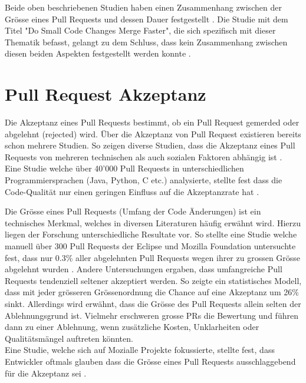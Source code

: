 Beide oben beschriebenen Studien haben einen Zusammenhang zwischen der Grösse eines Pull Requests und dessen Dauer festgestellt \parencite{yu_wait_2015}\parencite{hasan_understanding_2023}. Die Studie mit dem Titel "Do Small Code Changes Merge Faster", die sich spezifisch mit dieser Thematik befasst, gelangt zu dem Schluss, dass kein Zusammenhang zwischen diesen beiden Aspekten festgestellt werden konnte \parencite{kudrjavets_small_2022}.





\section{Pull Request Akzeptanz}
Die Akzeptanz eines Pull Requests bestimmt, ob ein Pull Request gemerded oder abgelehnt (rejected) wird. Über die Akzeptanz von Pull Request existieren bereits schon mehrere Studien. 
So zeigen diverse Studien, dass die Akzeptanz eines Pull Requests von mehreren technischen als auch sozialen Faktoren abhängig ist \parencite{gousios_exploratory_2014}. \\
Eine Studie welche über 40'000 Pull Requests in unterschiedlichen Programmiersprachen (Java, Python, C etc.) analysierte, stellte fest dass die Code-Qualität nur einen geringen Einfluss auf die Akzeptanzrate hat \parencite{kuhejda_pull_2023}.

Die Grösse eines Pull Requests (Umfang der Code Änderungen) ist ein technisches Merkmal, welches in diversen Literaturen häufig erwähnt wird. Hierzu liegen der Forschung unterschiedliche Resultate vor. So stellte eine Studie welche manuell über 300 Pull Requests der Eclipse und Mozilla Foundation untersuchte fest, dass nur 0.3\% aller abgelehnten Pull Requests wegen ihrer zu grossen Grösse abgelehnt wurden \parencite{tao_writing_2014}. Andere Untersuchungen ergaben, dass umfangreiche Pull Requests tendenziell seltener akzeptiert werden. So zeigte ein statistisches Modell, dass mit jeder grösseren Grössenordnung die Chance auf eine Akzeptanz um 26\% sinkt. Allerdings wird erwähnt, dass die Grösse des Pull Requests allein selten der Ablehnungsgrund ist. Vielmehr erschweren grosse PRs die Bewertung und führen dann zu einer Ablehnung, wenn zusätzliche Kosten, Unklarheiten oder Qualitätsmängel auftreten könnten.  \\
Eine Studie, welche sich auf Mozialle Projekte fokussierte, stellte fest, dass Entwickler oftmals glauben dass die Grösse eines Pull Requests ausschlaggebend für die Akzeptanz sei \parencite{kononenko_code_2016}.

